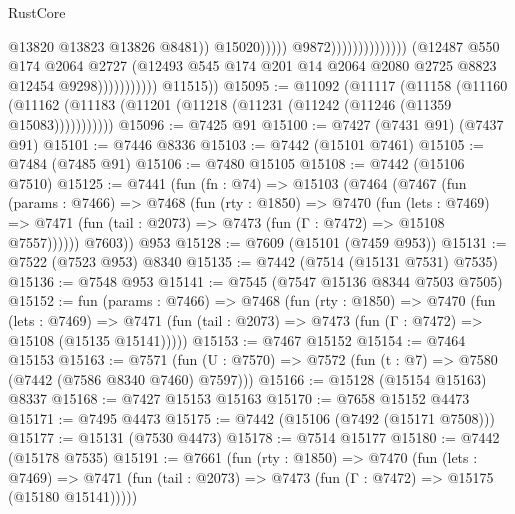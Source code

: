 \begin{lexlean}{RustCore}
\begin{coremodule}
                                                                    @13820
                                                                    @13823
                                                                    @13826
                                                                    @8481))
                                                                @15020)))))
                                                      @9872))))))))))))))
                          (@12487
                            @550
                            @174
                            @2064
                            @2727
                            (@12493
                              @545
                              @174
                              @201
                              @14
                              @2064
                              @2080
                              @2725
                              @8823
                              @12454
                              @9298)))))))))))
        @11515))
@15095 := @11092
    (@11117
      (@11158
        (@11160 (@11162 (@11183 (@11201 (@11218 (@11231 (@11242 (@11246 (@11359 @15083)))))))))))
@15096 := @7425 @91
@15100 := @7427 (@7431 @91) (@7437 @91)
@15101 := @7446 @8336
@15103 := @7442 (@15101 @7461)
@15105 := @7484 (@7485 @91)
@15106 := @7480 @15105
@15108 := @7442 (@15106 @7510)
@15125 := @7441
    (fun (fn : @74) =>
    @15103
      (@7464
        (@7467
          (fun (params : @7466) =>
          @7468
            (fun (rty : @1850) =>
            @7470
              (fun (lets : @7469) =>
              @7471 (fun (tail : @2073) => @7473 (fun (Γ : @7472) => @15108 @7557))))))
        @7603))
    @953
@15128 := @7609 (@15101 (@7459 @953))
@15131 := @7522 (@7523 @953) @8340
@15135 := @7442 (@7514 (@15131 @7531) @7535)
@15136 := @7548 @953
@15141 := @7545 (@7547 @15136 @8344 @7503 @7505)
@15152 := fun (params : @7466) =>
  @7468
    (fun (rty : @1850) =>
    @7470
      (fun (lets : @7469) =>
      @7471 (fun (tail : @2073) => @7473 (fun (Γ : @7472) => @15108 (@15135 @15141)))))
@15153 := @7467 @15152
@15154 := @7464 @15153
@15163 := @7571 (fun (U : @7570) => @7572 (fun (t : @7) => @7580 (@7442 (@7586 @8340 @7460) @7597)))
@15166 := @15128 (@15154 @15163) @8337
@15168 := @7427 @15153 @15163
@15170 := @7658 @15152 @4473
@15171 := @7495 @4473
@15175 := @7442 (@15106 (@7492 (@15171 @7508)))
@15177 := @15131 (@7530 @4473)
@15178 := @7514 @15177
@15180 := @7442 (@15178 @7535)
@15191 := @7661
    (fun (rty : @1850) =>
    @7470
      (fun (lets : @7469) =>
      @7471 (fun (tail : @2073) => @7473 (fun (Γ : @7472) => @15175 (@15180 @15141)))))

\end{coremodule}
\end{lexlean}
